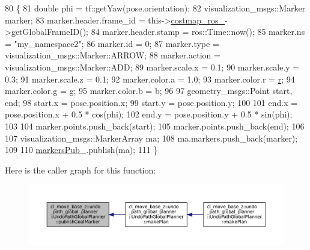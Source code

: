 \begin{DoxyCode}
80         \{
81             \textcolor{keywordtype}{double} phi = tf::getYaw(pose.orientation);
82             visualization\_msgs::Marker marker;
83             marker.header.frame\_id = this->\hyperlink{classcl__move__base__z_1_1undo__path__global__planner_1_1UndoPathGlobalPlanner_ab63eeb465e3ae989a6edcc4d059cf8f0}{costmap\_ros\_}->getGlobalFrameID();
84             marker.header.stamp = ros::Time::now();
85             marker.ns = \textcolor{stringliteral}{"my\_namespace2"};
86             marker.id = 0;
87             marker.type = visualization\_msgs::Marker::ARROW;
88             marker.action = visualization\_msgs::Marker::ADD;
89             marker.scale.x = 0.1;
90             marker.scale.y = 0.3;
91             marker.scale.z = 0.1;
92             marker.color.a = 1.0;
93             marker.color.r = \hyperlink{namespacefake__cube__perception__node_a36e88703ab69fd35065e8a8d9344903e}{r};
94             marker.color.g = g;
95             marker.color.b = b;
96 
97             geometry\_msgs::Point start, end;
98             start.x = pose.position.x;
99             start.y = pose.position.y;
100 
101             end.x = pose.position.x + 0.5 * cos(phi);
102             end.y = pose.position.y + 0.5 * sin(phi);
103 
104             marker.points.push\_back(start);
105             marker.points.push\_back(end);
106 
107             visualization\_msgs::MarkerArray ma;
108             ma.markers.push\_back(marker);
109 
110             \hyperlink{classcl__move__base__z_1_1undo__path__global__planner_1_1UndoPathGlobalPlanner_abfa0536872a0e3f8c823bebf0ed398fb}{markersPub\_}.publish(ma);
111         \}
\end{DoxyCode}
Here is the caller graph for this function\+:
\nopagebreak
\begin{figure}[H]
\begin{center}
\leavevmode
\includegraphics[width=350pt]{classcl__move__base__z_1_1undo__path__global__planner_1_1UndoPathGlobalPlanner_a37a85e1cd57173902d8302cb8cb9b933_icgraph}
\end{center}
\end{figure}


